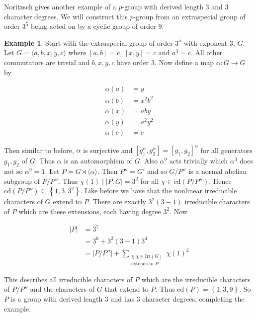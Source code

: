 \documentclass[]{amsart}
\theoremstyle{definition}
\theoremstyle{definition}
\theoremstyle{definition}
\newtheorem{ex}[theorem]{Example}
\theoremstyle{definition}
\theoremstyle{remark}
\theoremstyle{remark}
\newcommand{\abs}[1]{\left\lvert{#1}\right\rvert}
\newcommand{\set}[1]{\left\{{#1}\right\}}
\begin{document}
        Noritzsch \cite{Nor} gives another example of a $p$-group with derived length 3 and 3 character degrees. We will construct this $p$-group from an extraspecial group of order $3^5$ being acted on by a cyclic group of order $9$.
        \begin{ex}
    
            Start with the extraspecial group of order $3^5$ with exponent $3$, $G$. Let $G=\langle a,b,x,y,c\rangle $ where $[a,b]=c$, $[x,y]=c$ and $a^3=c$. All other commutators are trivial and $b,x,y,c$ have order $3$. Now define a map $\alpha:G\to G$ by 
            
            \begin{align*} 
                \alpha(a)&=y\\
                \alpha(b)&=x^2b^2\\
                \alpha(x)&=aby\\
                \alpha(y)&=a^2y^2\\
                \alpha(c)&=c 
            \end{align*}

            Then similar to before, $\alpha$ is surjective and $[g_1^{\alpha},g_2^{\alpha}]=[g_1,g_2]^{\alpha}$ for all generators $g_1,g_2$ of $G$. Thus $\alpha$ is an automorphism of $G$. Also $\alpha^9$ acts trivially which $\alpha^3$ does not so $\alpha^9=1$. Let $P=G\rtimes \langle \alpha \rangle$. Then $P''=G'$ and so $G/P''$ is a normal abelian subgroup of $P/P''$. Thus $\chi(1)\mid \abs{P:G}=3^2$ for all $\chi\in \mathrm{cd}(P/P'')$. Hence $\mathrm{cd}(P/P'')\subseteq \set{1,3,3^2}$. Like before we have that the nonlinear irreducible characters of $G$ extend to $P$. There are exactly $3^2(3-1)$ irreducible characters of $P$ which are these extensions, each having degree $3^2$. Now 

            \begin{align*}
                \abs{P}&= 3^7\\
                &= 3^6+3^2(3-1)3^4\\
                &=\abs{P/P''}+\sum_{\substack{\chi| \chi\in \mathrm{Irr}(G) \\ \text{extends to } P}} \chi(1)^2
            \end{align*}

             This describes all irreducible characters of $P$ which are the irreducible characters of $P/P''$ and the characters of $G$ that extend to $P$. Thus $\mathrm{cd}(P)=\set{1,3,9}$. So $P$ is a group with derived length 3 and has 3 character degrees, completing the example.
        \end{ex}
\end{document}

